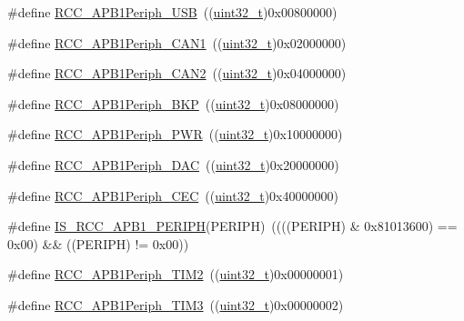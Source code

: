 \begin{DoxyCompactItemize}
\item 
\#define \hyperlink{group___a_p_b1__peripheral_ga69a1b3de9a59155bc8455eea5a15e3e4}{R\+C\+C\+\_\+\+A\+P\+B1\+Periph\+\_\+\+U\+SB}~((\hyperlink{_p_e___types_8h_a33594304e786b158f3fb30289278f5af}{uint32\+\_\+t})0x00800000)
\item 
\#define \hyperlink{group___a_p_b1__peripheral_ga7f1d940739de0134ae89e9e04214989d}{R\+C\+C\+\_\+\+A\+P\+B1\+Periph\+\_\+\+C\+A\+N1}~((\hyperlink{_p_e___types_8h_a33594304e786b158f3fb30289278f5af}{uint32\+\_\+t})0x02000000)
\item 
\#define \hyperlink{group___a_p_b1__peripheral_ga62801597b97816751c038acb1466179c}{R\+C\+C\+\_\+\+A\+P\+B1\+Periph\+\_\+\+C\+A\+N2}~((\hyperlink{_p_e___types_8h_a33594304e786b158f3fb30289278f5af}{uint32\+\_\+t})0x04000000)
\item 
\#define \hyperlink{group___a_p_b1__peripheral_ga2a26b65d0e38030e414a9d39276645b1}{R\+C\+C\+\_\+\+A\+P\+B1\+Periph\+\_\+\+B\+KP}~((\hyperlink{_p_e___types_8h_a33594304e786b158f3fb30289278f5af}{uint32\+\_\+t})0x08000000)
\item 
\#define \hyperlink{group___a_p_b1__peripheral_ga59ae4e17d5b35a934b1614f8ee883834}{R\+C\+C\+\_\+\+A\+P\+B1\+Periph\+\_\+\+P\+WR}~((\hyperlink{_p_e___types_8h_a33594304e786b158f3fb30289278f5af}{uint32\+\_\+t})0x10000000)
\item 
\#define \hyperlink{group___a_p_b1__peripheral_ga8d019a727701634822c19371b6aaabb5}{R\+C\+C\+\_\+\+A\+P\+B1\+Periph\+\_\+\+D\+AC}~((\hyperlink{_p_e___types_8h_a33594304e786b158f3fb30289278f5af}{uint32\+\_\+t})0x20000000)
\item 
\#define \hyperlink{group___a_p_b1__peripheral_gaa96437b649e13586945f40dac318a0ae}{R\+C\+C\+\_\+\+A\+P\+B1\+Periph\+\_\+\+C\+EC}~((\hyperlink{_p_e___types_8h_a33594304e786b158f3fb30289278f5af}{uint32\+\_\+t})0x40000000)
\item 
\#define \hyperlink{group___a_p_b1__peripheral_gab68e85308494436c4c55a69c42a79f36}{I\+S\+\_\+\+R\+C\+C\+\_\+\+A\+P\+B1\+\_\+\+P\+E\+R\+I\+PH}(P\+E\+R\+I\+PH)~((((P\+E\+R\+I\+PH) \& 0x81013600) == 0x00) \&\& ((\+P\+E\+R\+I\+P\+H) != 0x00))
\item 
\#define \hyperlink{group___a_p_b1__peripheral_ga742bab2f04cebe587574b53f7107aeaf}{R\+C\+C\+\_\+\+A\+P\+B1\+Periph\+\_\+\+T\+I\+M2}~((\hyperlink{_p_e___types_8h_a33594304e786b158f3fb30289278f5af}{uint32\+\_\+t})0x00000001)
\item 
\#define \hyperlink{group___a_p_b1__peripheral_gad4454f63a511a256e55aad55c03beb76}{R\+C\+C\+\_\+\+A\+P\+B1\+Periph\+\_\+\+T\+I\+M3}~((\hyperlink{_p_e___types_8h_a33594304e786b158f3fb30289278f5af}{uint32\+\_\+t})0x00000002)

\end{DoxyCompactItemize}
